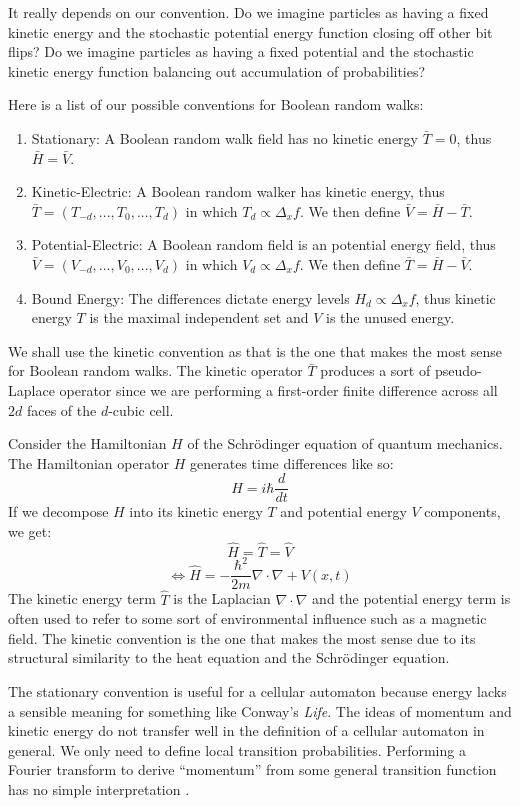 \documentclass[10pt, a5paper, twoside, openright]{memoir}
\begin{document}
It really depends on our convention. Do we imagine particles as having a fixed kinetic energy and the stochastic potential energy function closing off other bit flips? Do we imagine particles as having a fixed potential and the stochastic kinetic energy function balancing out accumulation of probabilities? 

Here is a list of our possible conventions for Boolean random walks:
\begin{enumerate}
\item Stationary: A Boolean random walk field has no kinetic energy $\bar T = 0$, thus $\bar H = \bar V$.
\item Kinetic-Electric: A Boolean random walker has kinetic energy, thus $\bar T = (T_{-d},...,T_0,...,T_{d})$ in which $T_d \propto \Delta_x f$. We then define $\bar V = \bar H - \bar T$.
\item Potential-Electric: A Boolean random field is an potential energy field, thus $\bar V = (V_{-d},...,V_0,...,V_{d})$ in which $V_d \propto \Delta_x f$. We then define $\bar T = \bar H - \bar V$.
\item Bound Energy: The differences dictate energy levels $H_d \propto \Delta_x f$, thus kinetic energy $T$ is the maximal independent set and $V$ is the unused energy.
\end{enumerate}
We shall use the kinetic convention as that is the one that makes the most sense for Boolean random walks. The kinetic operator $\bar T$ produces a sort of pseudo-Laplace operator since we are performing a first-order finite difference across all $2 d$ faces of the $d$-cubic cell. 

Consider the Hamiltonian $H$ of the Schr\"{o}dinger equation of quantum mechanics. The Hamiltonian operator $H$ generates time differences like so:
$$H = i \hbar \frac{d}{dt}$$
If we decompose $H$ into its kinetic energy $T$ and potential energy $V$ components, we get:
$$\hat H = \hat T = \hat V$$
$$\iff \hat H = -\frac{\hbar^2}{2m} \nabla \cdot \nabla + V(x, t)$$
The kinetic energy term $\hat T$ is the Laplacian $\nabla \cdot \nabla$ and the potential energy term is often used to refer to some sort of environmental influence such as a magnetic field. The kinetic convention is the one that makes the most sense due to its structural similarity to the heat equation and the Schr\"{o}dinger equation.

The stationary convention is useful for a cellular automaton because energy lacks a sensible meaning for something like Conway's \textit{Life}. The ideas of momentum and kinetic energy do not transfer well in the definition of a cellular automaton in general. We only need to define local transition probabilities. Performing a Fourier transform to derive ``momentum'' from some general transition function has no simple interpretation . 
\end{document}
